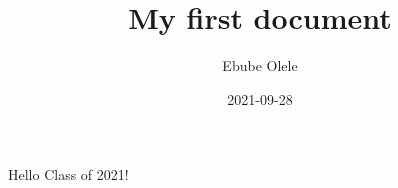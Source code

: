 \documentclass{article}
\title{My first document}
\date{2021-09-28}
\author{Ebube Olele}
\begin{document}
	\maketitle
	\newpage
	Hello Class of 2021!
\end{document}
